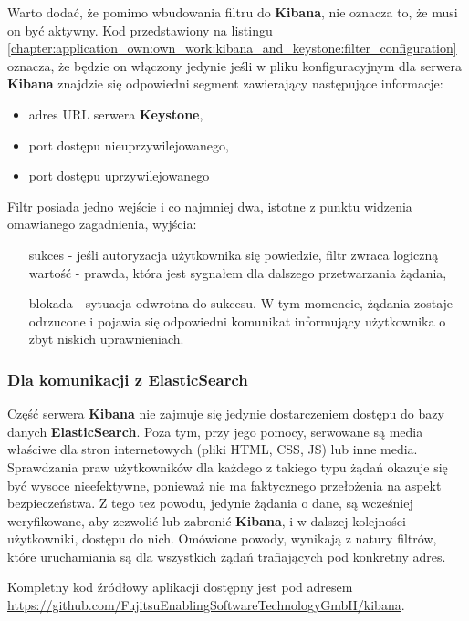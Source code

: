     Warto dodać, że pomimo wbudowania filtru do \textbf{Kibana}, nie oznacza to, że musi on być aktywny. Kod
    przedstawiony na listingu \ref{chapter:application_own:own_work:kibana_and_keystone:filter_configuration} oznacza,
    że będzie on włączony jedynie jeśli w pliku konfiguracyjnym dla serwera \textbf{Kibana} znajdzie się odpowiedni
    segment zawierający następujące informacje:
    \begin{itemize}
        \item adres URL serwera \textbf{Keystone},
        \item port dostępu nieuprzywilejowanego,
        \item port dostępu uprzywilejowanego
    \end{itemize}
    
    Filtr posiada jedno wejście i co najmniej dwa, istotne z punktu widzenia omawianego zagadnienia, wyjścia:
    \begin{itemize}
        \item[sukces] - jeśli autoryzacja użytkownika się powiedzie, filtr zwraca logiczną wartość - prawda,
        która jest sygnałem dla dalszego przetwarzania żądania,
        \item[blokada] - sytuacja odwrotna do sukcesu. W tym momencie, żądania zostaje odrzucone
        i pojawia się odpowiedni komunikat informujący użytkownika o zbyt niskich uprawnieniach.
    \end{itemize}
    
    \subsubsection{Dla komunikacji z ElasticSearch}
    Część serwera \textbf{Kibana} nie zajmuje się jedynie dostarczeniem dostępu do bazy danych
    \textbf{ElasticSearch}. Poza tym, przy jego pomocy, serwowane są media właściwe dla stron internetowych
    (pliki HTML, CSS, JS) lub inne media. Sprawdzania praw użytkowników dla
    każdego z takiego typu żądań okazuje się być wysoce nieefektywne, ponieważ nie ma faktycznego
    przełożenia na aspekt bezpieczeństwa. Z tego tez powodu, jedynie żądania o dane, są wcześniej 
    weryfikowane, aby zezwolić lub zabronić \textbf{Kibana}, i w dalszej kolejności użytkowniki,
    dostępu do nich. Omówione powody, wynikają z natury filtrów, które uruchamiania są dla 
    wszystkich żądań trafiających pod konkretny adres.

Kompletny kod źródłowy aplikacji dostępny jest pod adresem \url{https://github.com/FujitsuEnablingSoftwareTechnologyGmbH/kibana}.

